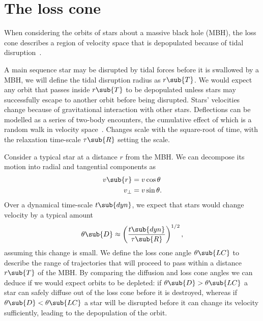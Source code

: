 \chapter{The loss cone}

When considering the orbits of stars about a massive black hole (MBH), the loss cone describes a region of velocity space that is depopulated because of tidal disruption~\citep{Frank1976,Lightman1977}.

A main sequence star may be disrupted by tidal forces before it is swallowed by a MBH, we will define the tidal disruption radius as $r\sub{T}$. We would expect any orbit that passes inside $r\sub{T}$ to be depopulated unless stars may successfully escape to another orbit before being disrupted. Stars' velocities change because of gravitational interaction with other stars. Deflections can be modelled as a series of two-body encounters, the cumulative effect of which is a random walk in velocity space~\citep[chapter 2]{Chandrasekhar1960}. Changes scale with the square-root of time, with the relaxation time-scale $\tau\sub{R}$ setting the scale.

Consider a typical star at a distance $r$ from the MBH. We can decompose its motion into radial and tangential components as
\begin{subequations}
\begin{align}
v\sub{r} = {} & v\cos \theta \\
v_\perp = {} & v\sin \theta.
\end{align}
\end{subequations}
Over a dynamical time-scale $t\sub{dyn}$, we expect that stars would change velocity by a typical amount
\begin{equation}
\theta\sub{D} \approx \left(\frac{t\sub{dyn}}{\tau\sub{R}}\right)^{1/2},
\end{equation}
assuming this change is small. We define the loss cone angle $\theta\sub{LC}$ to describe the range of trajectories that will proceed to pass within a distance $r\sub{T}$ of the MBH. By comparing the diffusion and loss cone angles we can deduce if we would expect orbits to be depleted: if $\theta\sub{D} > \theta\sub{LC}$ a star can safely diffuse out of the loss cone before it is destroyed, whereas if $\theta\sub{D} < \theta\sub{LC}$ a star will be disrupted before it can change its velocity sufficiently, leading to the depopulation of the orbit.

